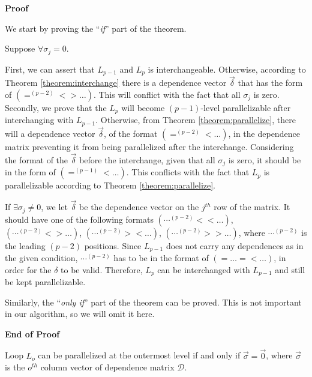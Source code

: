 \begin{flushleft}
\textbf{Proof} 
\end{flushleft}

We start by proving the ``\emph{if}'' part of the theorem.

Suppose $\forall \sigma_{j}=0$. 

First, we can assert that $L_{p-1}$ and
$L_{p}$ is interchangeable. Otherwise, according to Theorem
\ref{theorem:interchange} there is a dependence vector $\vec{\delta}$
that has the form of $(=^{(p-2)} < > \ldots)$. This will conflict with the
fact that all $\sigma_{j}$ is zero.
Secondly, we prove that the $L_{p}$ will become $(p-1)$-level
parallelizable after interchanging with $L_{p-1}$.  Otherwise, from
Theorem \ref{theorem:parallelize}, there will a dependence vector
$\vec{\delta}$, of the format $(=^{(p-2)} < \ldots)$, in the
dependence matrix preventing it from being parallelized after the
interchange. Considering the format of the $\vec{\delta}$ before the
interchange, given that all $\sigma_{j}$ is zero, it should be in the
form of $(=^{(p-1)} < \ldots)$. This conflicts with the fact that $L_{p}$
is parallelizable according to Theorem \ref{theorem:parallelize}.

If $\exists \sigma_{j} \neq 0$, we let $\vec{\delta}$ be the
dependence vector on the $j^{th}$ row of the matrix. It should have
one of the following formats $(\cdots^{(p-2)} < < \ldots)$,
$(\cdots^{(p-2)} < > \ldots)$, $(\cdots^{(p-2)} > < \ldots)$,
$(\cdots^{(p-2)} > > \ldots)$, where $\cdots^{(p-2)}$ is the leading
$(p-2)$ positions. Since $L_{p-1}$ does not carry any dependences as
in the given condition, $\cdots^{(p-2)}$ has to be in the format of
$(= \ldots = < \ldots)$, in order for the $\delta$ to be valid. Therefore,
$L_{p}$ can be interchanged with $L_{p-1}$ and still be kept parallelizable.

Similarly, the ``\emph{only if}'' part of the theorem can be proved. This is not important in our algorithm, so we will omit it here.

\begin{flushright}
\textbf{End of Proof} 
\end{flushright}

\begin{theorem} \label{theorem:outermost}
  Loop $L_{o}$ can be parallelized at the outermost level if and only
  if  $\vec{\sigma} = \vec{0}$, where $\vec{\sigma}$ is the
  $o^{th}$ column vector of dependence matrix $\mathcal{D}$.
\end{theorem} 

